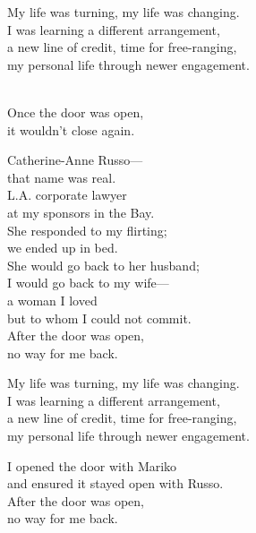 \begin{lyrics}
My life was turning, my life was changing.\\
I was learning a different arrangement,\\
a new line of credit, time for free-ranging,\\
my personal life through newer engagement.

\\
Once the door was open,\\
it wouldn’t close again.

Catherine-Anne Russo—\\
that name was real.\\
L.A. corporate lawyer\\
at my sponsors in the Bay.\\
She responded to my flirting;\\
we ended up in bed.\\
She would go back to her husband;\\
I would go back to my wife—\\
a woman I loved\\
but to whom I could not commit.\\
After the door was open,\\
no way for me back.

My life was turning, my life was changing.\\
I was learning a different arrangement,\\
a new line of credit, time for free-ranging,\\
my personal life through newer engagement.

I opened the door with Mariko\\
and ensured it stayed open with Russo.\\
After the door was open,\\
no way for me back.
\end{lyrics}

